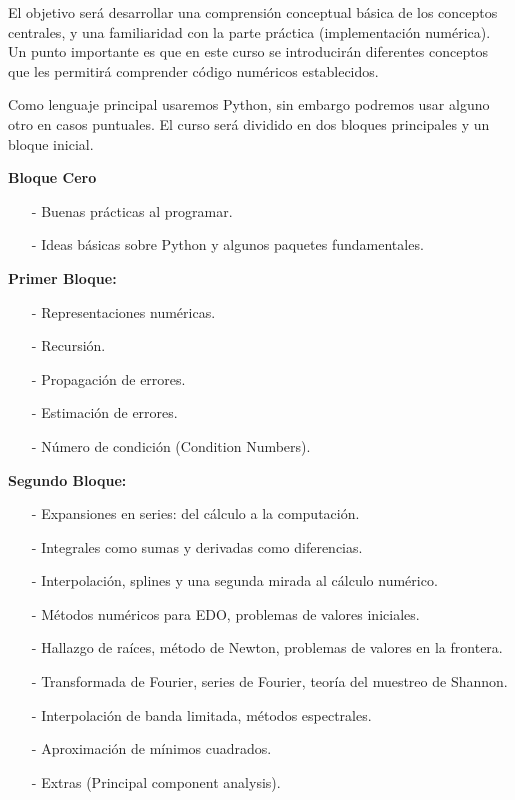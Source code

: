 \documentclass[12pt]{amsart} %
\begin{document}
\vspace{8pt}

El objetivo será desarrollar una comprensión conceptual básica de los conceptos centrales, y una familiaridad con la parte práctica (implementación numérica). Un punto importante es que en este curso se introducirán diferentes conceptos que les permitirá comprender código numéricos establecidos.

\vspace{8pt}
Como lenguaje principal usaremos Python, sin embargo podremos usar alguno otro en casos puntuales. El curso será dividido en dos bloques principales y un bloque inicial.

\vspace{8pt}

\textbf{Bloque Cero}
\begin{enumerate}
	\item[-] Buenas prácticas al programar.
	\item[-] Ideas básicas sobre Python y algunos paquetes fundamentales.
\end{enumerate}

\textbf{Primer Bloque:}
\begin{itemize}
	\item[-] Representaciones numéricas.
	\item[-] Recursión.
	\item[-] Propagación de errores.
	\item[-] Estimación de errores.
	\item[-] Número de condición  (Condition Numbers).
\end{itemize}

\textbf{Segundo Bloque:}
\begin{itemize}
	\item[-] Expansiones en series: del cálculo a la computación.
	\item[-] Integrales como sumas y derivadas como diferencias.
	\item[-] Interpolación, splines y una segunda mirada al cálculo numérico.
	\item[-] Métodos numéricos para EDO, problemas de valores iniciales.
	\item[-] Hallazgo de raíces, método de Newton, problemas de valores en la frontera.
	\item[-] Transformada de Fourier, series de Fourier, teoría del muestreo de Shannon.
	\item[-] Interpolación de banda limitada, métodos espectrales.
	\item[-] Aproximación de mínimos cuadrados.
	\item[-] Extras (Principal component analysis). 
\end{itemize}
\vspace{8pt}
\end{document}
